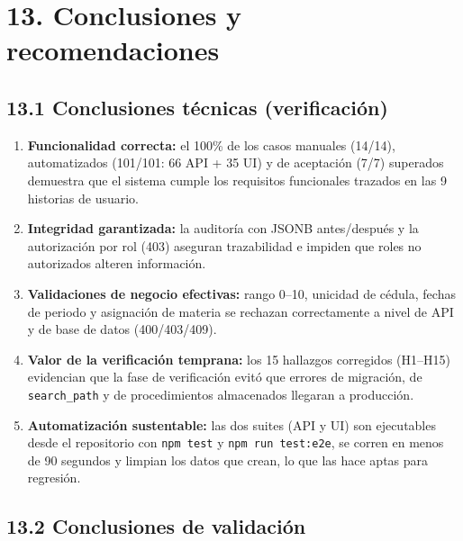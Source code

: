 \documentclass[11pt,a4paper]{article}
\begin{document}
\section*{13. Conclusiones y recomendaciones}


\subsection*{13.1 Conclusiones técnicas (verificación)}


\begin{enumerate}[leftmargin=*]
\item \textbf{Funcionalidad correcta:} el 100\% de los casos manuales (14/14), automatizados (101/101: 66 API + 35 UI) y de aceptación (7/7) superados demuestra que el sistema cumple los requisitos funcionales trazados en las 9 historias de usuario.
\item \textbf{Integridad garantizada:} la auditoría con JSONB antes/después y la autorización por rol (403) aseguran trazabilidad e impiden que roles no autorizados alteren información.
\item \textbf{Validaciones de negocio efectivas:} rango 0--10, unicidad de cédula, fechas de periodo y asignación de materia se rechazan correctamente a nivel de API y de base de datos (400/403/409).
\item \textbf{Valor de la verificación temprana:} los 15 hallazgos corregidos (H1--H15) evidencian que la fase de verificación evitó que errores de migración, de \texttt{search\_path} y de procedimientos almacenados llegaran a producción.
\item \textbf{Automatización sustentable:} las dos suites (API y UI) son ejecutables desde el repositorio con \texttt{npm test} y \texttt{npm run test:e2e}, se corren en menos de 90 segundos y limpian los datos que crean, lo que las hace aptas para regresión.
\end{enumerate}


\subsection*{13.2 Conclusiones de validación}
\end{document}
